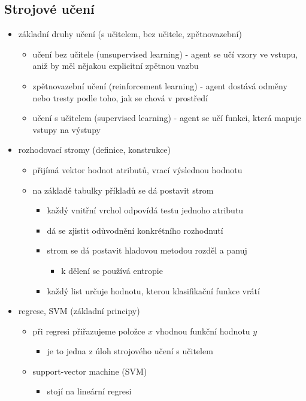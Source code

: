 \subsection{Strojové učení}
\begin{itemize}
\item základní druhy učení (s učitelem, bez učitele, zpětnovazební)
\begin{itemize}
\item učení bez učitele (unsupervised learning) - agent se učí vzory ve vstupu, aniž by měl nějakou explicitní zpětnou vazbu
\item zpětnovazební učení (reinforcement learning) - agent dostává odměny nebo tresty podle toho, jak se chová v prostředí
\item učení s učitelem (supervised learning) - agent se učí funkci, která mapuje vstupy na výstupy
\end{itemize}
\item rozhodovací stromy (definice, konstrukce)
\begin{itemize}
\item přijímá vektor hodnot atributů, vrací výslednou hodnotu
\item na základě tabulky příkladů se dá postavit strom
\begin{itemize}
\item každý vnitřní vrchol odpovídá testu jednoho atributu
\item dá se zjistit odůvodnění konkrétního rozhodnutí
\item strom se dá postavit hladovou metodou rozděl a panuj
\begin{itemize}
\item k dělení se používá entropie
\end{itemize}
\item každý list určuje hodnotu, kterou klasifikační funkce vrátí
\end{itemize}
\end{itemize}
\item regrese, SVM (základní principy)
\begin{itemize}
\item při regresi přiřazujeme položce $x$ vhodnou funkční hodnotu $y$
\begin{itemize}
\item je to jedna z úloh strojového učení s učitelem
\end{itemize}
\item support-vector machine (SVM)
\begin{itemize}
\item stojí na lineární regresi

\end{itemize}
\end{itemize}
\end{itemize}
